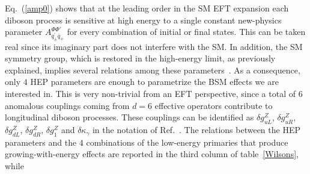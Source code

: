 Eq.~(\ref{amp0}) shows that at the leading order in the SM EFT expansion each diboson process is sensitive at high energy to a single constant new-physics parameter $A^{\Phi\Phi'}_{q^\prime_{\pm}{\overline{q}}_{\mp}}$ for every combination of initial or final states. This can be taken real since its imaginary part does not interfere with the SM. In addition, the SM symmetry group, which is restored in the high-energy limit, as previously explained, implies  several relations among these parameters~\cite{Franceschini:2017ab}. %
As a consequence, only $4$ HEP parameters are enough to parametrize the BSM effects we are interested in. This is very non-trivial from an EFT perspective, since a total of $6$ anomalous couplings coming from $d=6$ effective operators contribute to longitudinal diboson processes. These couplings can be identified as
${\delta g^Z_{uL}}$, ${\delta g^Z_{uR}}$, ${\delta g^Z_{dL}}$, ${\delta g^Z_{dR}}$, ${\delta g_1^Z}$ and ${\delta \kappa_{\gamma}}$ in the notation of Ref.~\cite{Gupta:2014rxa}.
The relations between the HEP parameters and the $4$ combinations of the low-energy primaries that produce growing-with-energy effects are reported in the third column of table~\ref{Wilsons}, while
